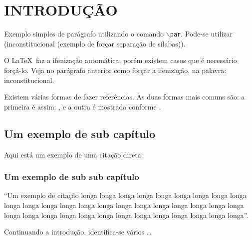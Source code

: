 
\chapter{INTRODUÇÃO}

\par Exemplo simples de parágrafo utilizando o comando \texttt{$\backslash$par}. Pode-se utilizar (in\-cons\-titucional (exemplo de forçar separação de sílabas)).

\par O \LaTeX~faz a ifenização automática, porém existem casos que é necessário forçá-lo. Veja no parágrafo anterior como forçar a ifenização, na palavra: inconstitucional.

\par Existem várias formas de fazer referências. As duas formas mais comuns são: a primeira é assim: \cite{revista_patio_pedagoria_ar_livre}, e a outra é mostrada conforme \cite{ecocentro}.


\section{Um exemplo de sub capítulo}


\par Aqui está um exemplo de uma citação direta:

\subsection{Um exemplo de sub sub capítulo}

\begin{citacao}
``Um exemplo de citação longa longa longa longa longa longa longa longa longa longa longa longa longa longa longa longa longa longa longa longa longa longa longa longa longa longa longa longa longa longa longa longa longa longa longa''. \cite{gadotti2003boniteza}
\end{citacao}

\par Continuando a introdução, identifica-se vários \ldots